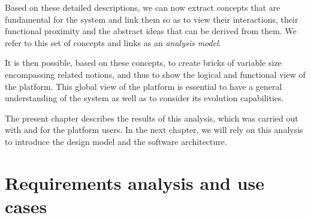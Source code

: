 Based on these detailed descriptions, we can now extract concepts that are fundamental for the system and link them so as to view their interactions, their functional proximity and the abstract ideas that can be derived from them. We refer to this set of concepts and links as an \emph{analysis model}.

It is then possible, based on these concepts, to create bricks of variable size encompassing related notions, and thus to show the logical and functional view of the platform. This global view of the platform is essential to have a general understanding of the system as well as to consider its evolution capabilities.

The present chapter describes the results of this analysis, which was carried out with and for the platform users. In the next chapter, we will rely on this analysis to introduce the design model and the software architecture.

\section{Requirements analysis and use cases}

